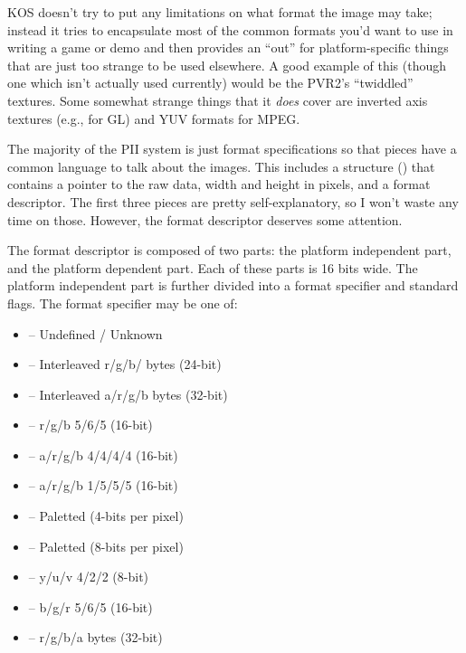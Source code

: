\documentclass[english]{report}
\begin{document}
KOS doesn't try to put any limitations on what format the image may
take; instead it tries to encapsulate most of the common formats you'd
want to use in writing a game or demo and then provides an ``out''
for platform-specific things that are just too strange to be used
elsewhere. A good example of this (though one which isn't actually
used currently) would be the PVR2's ``twiddled'' textures. Some
somewhat strange things that it \emph{does} cover are inverted axis
textures (e.g., for GL) and YUV formats for MPEG\tm.

The majority of the PII system is just format specifications so that
pieces have a common language to talk about the images. This includes
a structure () that contains a pointer to the raw data,
width and height in pixels, and a format descriptor. The first three
pieces are pretty self-explanatory, so I won't waste any time on those.
However, the format descriptor deserves some attention.

The format descriptor is composed of two parts: the platform independent
part, and the platform dependent part. Each of these parts is 16 bits
wide. The platform independent part is further divided into a format
specifier and standard flags. The format specifier may be one of:

\begin{itemize}
\item {} -- Undefined / Unknown
\item {} -- Interleaved r/g/b/ bytes (24-bit)
\item {} -- Interleaved a/r/g/b bytes (32-bit)
\item {} -- r/g/b 5/6/5 (16-bit)
\item {} -- a/r/g/b 4/4/4/4 (16-bit)
\item {} -- a/r/g/b 1/5/5/5 (16-bit)
\item {} -- Paletted (4-bits per pixel)
\item {} -- Paletted (8-bits per pixel)
\item {} -- y/u/v 4/2/2 (8-bit)
\item {} -- b/g/r 5/6/5 (16-bit)
\item {} -- r/g/b/a bytes (32-bit)
\end{itemize}
\end{document}
